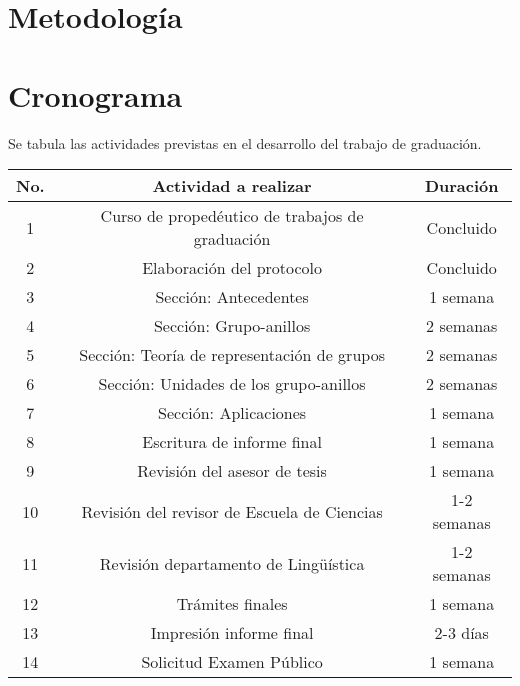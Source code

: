 \documentclass[12pt,letterpaper,titlepage]{article}
\begin{document}
\newpage

\section{Metodología}


\newpage

\section{Cronograma}
Se tabula las actividades previstas en el desarrollo del trabajo de graduación.

\vspace{1cm}

\begin{tabular}{|c|c|c|}
  \hline
   \textbf{No.}  &  \textbf{Actividad a realizar} &  \textbf{Duración }\\ \hline
  1  & Curso de propedéutico de trabajos de graduación & Concluido \\
  2  & Elaboración del protocolo & Concluido \\
  3  & Sección: Antecedentes & 1 semana \\
  4  & Sección: Grupo-anillos & 2 semanas \\
  5  & Sección: Teoría de representación de grupos & 2 semanas \\
  6  & Sección: Unidades de los grupo-anillos & 2 semanas \\
  7  & Sección: Aplicaciones & 1 semana \\
  8  & Escritura de informe final & 1 semana \\
  9  & Revisión del asesor de tesis & 1 semana \\
  10 & Revisión del revisor de Escuela de Ciencias & 1-2 semanas \\
  11 & Revisión departamento de Lingüística & 1-2 semanas \\
  12 & Trámites finales & 1 semana  \\
  13 & Impresión informe final & 2-3 días \\
  14 & Solicitud Examen Público & 1 semana \\
  \hline
\end{tabular}
\end{document}

